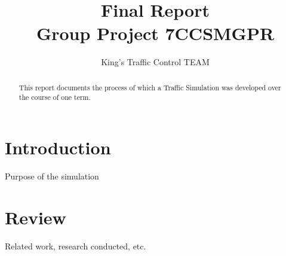 \documentclass{article}[11pt,Tahoma]
\begin{document}
	\title{Final Report\\ Group Project 7CCSMGPR} 	
    \author{King's Traffic Control TEAM}
	\maketitle
	\vspace
	\begin{abstract}
		This report documents the process of which a Traffic Simulation was developed over the course of one term.
	\end{abstract}
	\clearpage
	\tableofcontents
	\section{Introduction}
		Purpose of the simulation
	\section{Review}
		Related work, research conducted, etc.
\end{document}
